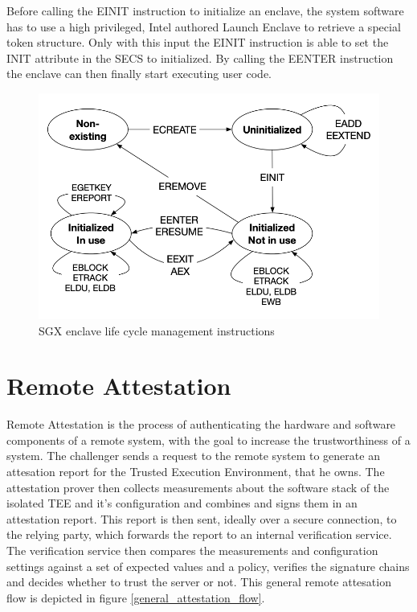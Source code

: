 Before calling the EINIT instruction to initialize an enclave, the system software has to use a high privileged, Intel authored Launch Enclave to retrieve a special token structure. Only with this input the EINIT instruction is able to set the INIT attribute in the SECS to initialized.\cite{sgx_explained}
By calling the EENTER instruction the enclave can then finally start executing user code. 

\begin{figure}
	\begin{center} 
		\includegraphics[width=0.7\linewidth]{figures/enclave-life-cycle.png}
	\end{center}
	\caption{SGX enclave life cycle management instructions \cite{sgx_explained}} 
	\label{enclave_lifecycle}
\end{figure}

\section{Remote Attestation}
Remote Attestation is the process of authenticating the hardware and software components of a remote system, with the goal to increase the trustworthiness of a system. The challenger sends a request to the remote system to generate an attesation report for the Trusted Execution Environment, that he owns. The attestation prover then collects measurements about the software stack of the isolated TEE and it’s configuration and combines and signs them in an attestation report. This report is then sent, ideally over a secure connection, to the relying party, which forwards the report to an internal verification service. The verification service then compares the measurements and configuration settings against a set of expected values and a policy, verifies the signature chains and decides whether to trust the server or not. This general remote attesation flow is depicted in figure \ref{general_attestation_flow}.

